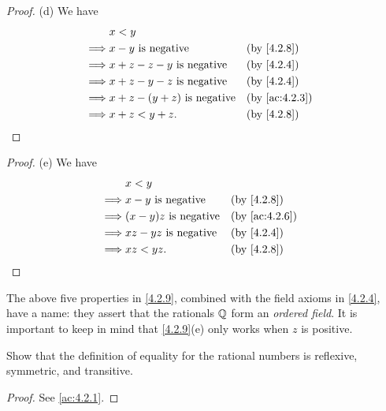 \begin{proof}{(d)}
  We have
  \begin{align*}
             & x < y                                                                \\
    \implies & x - y \text{ is negative}           &  & \by{4.2.8}                  \\
    \implies & x + z - z - y \text{ is negative}   &  & \by{4.2.4}                  \\
    \implies & x + z - y - z \text{ is negative}   &  & \by{4.2.4}                  \\
    \implies & x + z - (y + z) \text{ is negative} &  & \text{(by \cref{ac:4.2.3})} \\
    \implies & x + z < y + z.                      &  & \by{4.2.8}
  \end{align*}
\end{proof}

\begin{proof}{(e)}
  We have
  \begin{align*}
             & x < y                                                         \\
    \implies & x - y \text{ is negative}    &  & \by{4.2.8}                  \\
    \implies & (x - y)z \text{ is negative} &  & \text{(by \cref{ac:4.2.6})} \\
    \implies & xz - yz \text{ is negative}  &  & \by{4.2.4}                  \\
    \implies & xz < yz.                     &  & \by{4.2.8}
  \end{align*}
\end{proof}

\begin{rmk}\label{4.2.10}
  The above five properties in \cref{4.2.9}, combined with the field axioms in \cref{4.2.4}, have a name:
  they assert that the rationals \(\mathbb{Q}\) form an \emph{ordered field}.
  It is important to keep in mind that \cref{4.2.9}(e) only works when \(z\) is positive.
\end{rmk}

\exercisesection

\begin{ex}\label{ex:4.2.1}
  Show that the definition of equality for the rational numbers is reflexive, symmetric, and transitive.
\end{ex}

\begin{proof}
  See \cref{ac:4.2.1}.
\end{proof}

